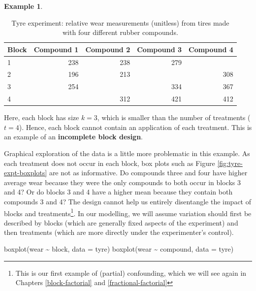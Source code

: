 \documentclass[
]{book}
\newenvironment{Shaded}{\begin{snugshade}}{\end{snugshade}}
\newcommand{\AttributeTok}[1]{\textcolor[rgb]{0.77,0.63,0.00}{#1}}
\newcommand{\FunctionTok}[1]{\textcolor[rgb]{0.00,0.00,0.00}{#1}}
\newcommand{\NormalTok}[1]{#1}
\newcommand{\SpecialCharTok}[1]{\textcolor[rgb]{0.00,0.00,0.00}{#1}}
\theoremstyle{definition}
\theoremstyle{definition}
\newtheorem{example}{Example}[chapter]
\theoremstyle{definition}
\theoremstyle{definition}
\theoremstyle{remark}
\begin{document}
\begin{example}
\begin{table}

\caption{\label{tab:tyre-expt-data}Tyre experiment: relative wear measurements (unitless) from tires made with four different rubber compounds.}
\centering
\begin{tabular}[t]{l|r|r|r|r}
\hline
Block & Compound 1 & Compound 2 & Compound 3 & Compound 4\\
\hline
1 & 238 & 238 & 279 & \\
\hline
2 & 196 & 213 &  & 308\\
\hline
3 & 254 &  & 334 & 367\\
\hline
4 &  & 312 & 421 & 412\\
\hline
\end{tabular}
\end{table}

Here, each block has size \(k=3\), which is smaller than the number of treatments (\(t=4\)). Hence, each block cannot contain an application of each treatment. This is an example of an \textbf{incomplete block design}.

Graphical exploration of the data is a little more problematic in this example. As each treatment does not occur in each block, box plots such as Figure \ref{fig:tyre-expt-boxplots} are not as informative. Do compounds three and four have higher average wear because they were the only compounds to both occur in blocks 3 and 4? Or do blocks 3 and 4 have a higher mean because they contain both compounds 3 and 4? The design cannot help us entirely disentangle the impact of blocks and treatments\footnote{This is our first example of (partial) confounding, which we will see again in Chapters \ref{block-factorial} and \ref{fractional-factorial}}. In our modelling, we will assume variation should first be described by blocks (which are generally fixed aspects of the experiment) and then treatments (which are more directly under the experimenter's control).

\begin{Shaded}
\begin{Highlighting}[]
\FunctionTok{boxplot}\NormalTok{(wear }\SpecialCharTok{\textasciitilde{}}\NormalTok{ block, }\AttributeTok{data =}\NormalTok{ tyre)}
\FunctionTok{boxplot}\NormalTok{(wear }\SpecialCharTok{\textasciitilde{}}\NormalTok{ compound, }\AttributeTok{data =}\NormalTok{ tyre)}
\end{Highlighting}
\end{Shaded}

\begin{figure}


\end{figure}
\end{example}
\end{document}
